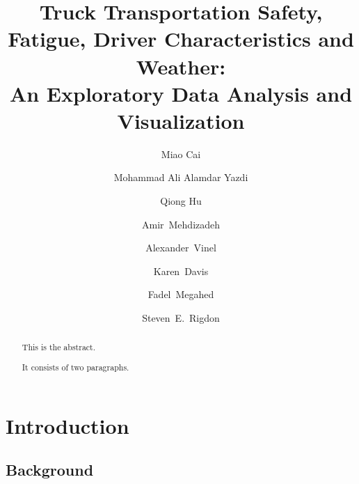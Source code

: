 \documentclass[]{elsarticle} %
\begin{document}
\begin{frontmatter}

  \title{Truck Transportation Safety, Fatigue, Driver Characteristics and Weather:\\
An Exploratory Data Analysis and Visualization}
    \author[SLU]{Miao Cai}
  
    \author[JHU]{Mohammad Ali Alamdar Yazdi}
  
    \author[AU]{Qiong Hu}
  
    \author[AU]{\mbox{Amir Mehdizadeh}}
  
    \author[AU]{\mbox{Alexander Vinel}}
  
    \author[MU]{\mbox{Karen Davis}}
  
    \author[MU]{\mbox{Fadel Megahed}}
  
    \author[SLU]{\mbox{Steven E. Rigdon}}
      \address[SLU]{Saint Louis University, Saint Louis, MO, 63108}
    \address[JHU]{Johns Hopkins University, Baltimore, MD, 21218}
    \address[AU]{Auburn University, Auburn, AL, 36849}
    \address[MU]{Miami University, Oxford, OH, 45056}
  
  \begin{abstract}
  \singlespacing This is the abstract.
  
  It consists of two paragraphs.
  \end{abstract}
  
 \end{frontmatter}

\linenumbers

\hypertarget{introduction}{%
\section{Introduction}\label{introduction}}

\hypertarget{background}{%
\subsection{Background}\label{background}}
\end{document}
